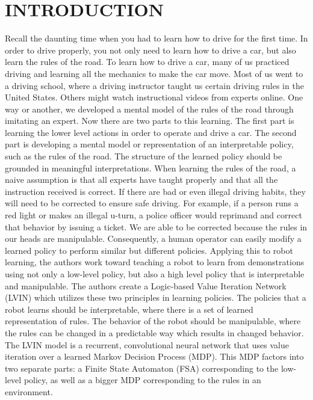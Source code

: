 \documentclass[letterpaper, 10 pt, conference]{ieeeconf}  %
\begin{document}
\section{INTRODUCTION}
Recall the daunting time when you had to learn how to drive for the first time. In order to drive properly, you not only need to learn how to drive a car, but also learn the rules of the road. To learn how to drive a car, many of us practiced driving and learning all the mechanics to make the car move. Most of us went to a driving school, where a driving instructor taught us certain driving rules in the United States. Others might watch instructional videos from experts online. One way or another, we developed a mental model of the rules of the road through imitating an expert.
\newline
\indent Now there are two parts to this learning. The first part is learning the lower level actions in order to operate and drive a car. The second part is developing a mental model or representation of an interpretable policy, such as the rules of the road. The structure of the learned policy should be grounded in meaningful interpretations.
\newline
\indent When learning the rules of the road, a naive assumption is that all experts have taught properly and that all the instruction received is correct. If there are bad or even illegal driving habits, they will need to be corrected to ensure safe driving. For example, if a person runs a red light or makes an illegal u-turn, a police officer would reprimand and correct that behavior by issuing a ticket. We are able to be corrected because the rules in our heads are manipulable. Consequently, a human operator can easily modify a learned policy to perform similar but different policies. 
\newline
\indent Applying this to robot learning, the authors work toward teaching a robot to learn from demonstrations using not only a low-level policy, but also a high level policy that is interpretable and manipulable. The authors create a Logic-based Value Iteration Network (LVIN) which utilizes these two principles in learning policies. The policies that a robot learns should be interpretable, where there is a set of learned representation of rules. The behavior of the robot should be manipulable, where the rules can be changed in a predictable way which results in changed behavior. The LVIN model is a recurrent, convolutional neural network that uses value iteration over a learned Markov Decision Process (MDP). This MDP factors into two separate parts: a Finite State Automaton (FSA) corresponding to the low-level policy, as well as a bigger MDP corresponding to the rules in an environment.
\end{document}
